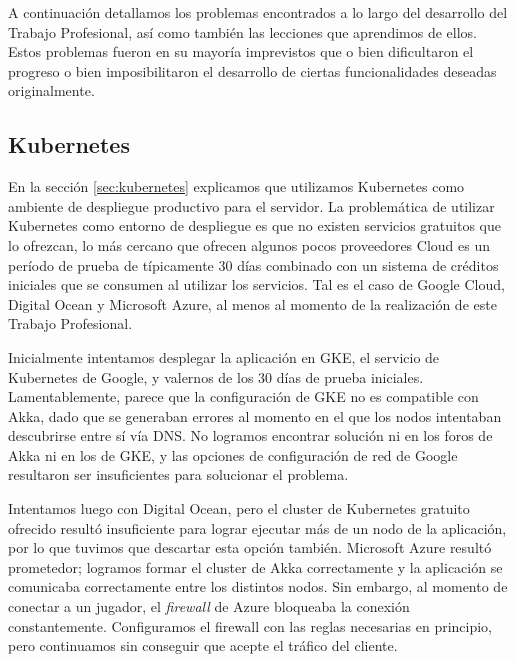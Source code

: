 
\noindent A continuación detallamos los problemas encontrados a lo largo del desarrollo del
Trabajo Profesional, así como también las lecciones que aprendimos de ellos. Estos problemas fueron en su mayoría imprevistos que o bien
dificultaron el progreso o bien imposibilitaron el desarrollo de ciertas funcionalidades deseadas originalmente.

\subsection{Kubernetes}
\label{sec:lessons-kubernetes}

\noindent En la sección \ref{sec:kubernetes} explicamos que utilizamos Kubernetes como ambiente de despliegue productivo para
el servidor. La problemática de utilizar Kubernetes como entorno de despliegue es que no existen servicios gratuitos que lo ofrezcan,
lo más cercano que ofrecen algunos pocos proveedores Cloud es un período de prueba de típicamente 30 días combinado con un sistema de
créditos iniciales que se consumen al utilizar los servicios. Tal es el caso de Google Cloud, Digital Ocean y Microsoft Azure, al menos al momento
de la realización de este Trabajo Profesional.

Inicialmente intentamos desplegar la aplicación en GKE, el servicio de Kubernetes de Google, y valernos de los 30 días de prueba iniciales. Lamentablemente,
parece que la configuración de GKE no es compatible con Akka, dado que se generaban errores al momento en el que los nodos intentaban descubrirse entre sí vía
DNS. No logramos encontrar solución ni en los foros de Akka ni en los de GKE, y las opciones de configuración de red de Google resultaron ser insuficientes para
solucionar el problema.

Intentamos luego con Digital Ocean, pero el cluster de Kubernetes gratuito ofrecido resultó insuficiente para lograr ejecutar más de un nodo de la aplicación, por lo que
tuvimos que descartar esta opción también. Microsoft Azure resultó prometedor; logramos formar el cluster de Akka correctamente y la aplicación se comunicaba correctamente entre
los distintos nodos. Sin embargo, al momento de conectar a un jugador, el \textit{firewall} de Azure bloqueaba la conexión constantemente. Configuramos el firewall con las reglas necesarias
en principio, pero continuamos sin conseguir que acepte el tráfico del cliente.

